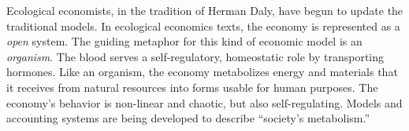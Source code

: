 
Ecological economists, 
in the tradition of Herman Daly, 
have begun to update the traditional models.\cite{F-K2003} 
In ecological economics texts, 
the economy is 
represented as a \emph{open} system. 
The guiding metaphor for this kind of 
economic model is an \emph{organism}.
The blood serves a self-regulatory, homeostatic role
by transporting hormones. 
Like an organism,
the economy metabolizes energy and materials 
that it receives from natural resources into forms 
usable for human purposes.
The economy's behavior is non-linear and chaotic,
but also self-regulating.
Models and accounting systems are being
developed to describe ``society's metabolism.''~\cite{F-K1998, 
ConAccount1998, Giampietro2000, Daniels2001, Ayres2002, 
Haberl2001, Giampietro2013}

